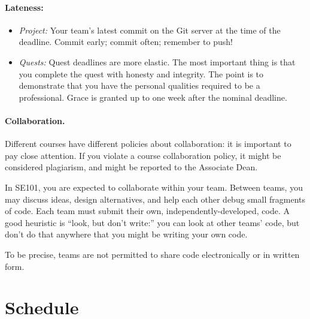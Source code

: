 \documentclass[11pt,onecolumn]{article}
\newcommand{\bi}{\begin{itemize}}
\newcommand{\ei}{\end{itemize}}
\newcommand{\biTight}{\vspace{-\parskip}\bi\setlength{\itemsep}{0pt}\setlength{\parskip}{0pt} }
\begin{document}
\newpage
\paragraph{Lateness:}
\biTight
    \item \emph{Project:} Your team's latest commit on the Git
    server at the time of the deadline. Commit early; commit often;
    remember to push!
    \item \emph{Quests:} Quest deadlines are more elastic. The most
    important thing is that you complete the quest with honesty and
    integrity. The point is to demonstrate that you have the personal
    qualities required to be a professional. Grace is granted up to 
    one week after the nominal deadline.
\ei


\paragraph{Collaboration.} Different courses have different policies
about collaboration: it is important to pay close attention. If you
violate a course collaboration policy, it might be considered
plagiarism, and might be reported to the Associate Dean.

In SE101, you are expected to collaborate within your team. Between
teams, you may discuss ideas, design alternatives, and help each other
debug small fragments of code. Each team must submit their own,
independently-developed, code. A good heuristic is ``look, but don't
write:'' you can look at other teams' code, but don't do that anywhere
that you might be writing your own code.

To be precise, teams are not permitted to share code electronically
or in written form.



\section{Schedule}
\end{document}
